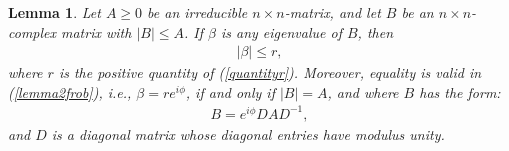 \documentclass[a4paper,11pt]{report}
\newtheorem{lemma}[theorem]{Lemma}
\begin{document}
  \begin{lemma}\label{lemma2frobvolledig}
    Let $A \geq 0$ be an irreducible $n\times n$-matrix, and let $B$ be an $n\times 
    n$- complex matrix with $|B|\leq A$. If $\beta$ is any eigenvalue of $B$, 
    then 
\begin{eqnarray}\label{lemma2frob}
|\beta| \leq r,  
\end{eqnarray}
where $r$ is the positive quantity of (\ref{quantityr}). Moreover, equality is 
valid in (\ref{lemma2frob}), i.e., $\beta = re^{i\phi}$, if and only if $|B| = 
A$, and where $B$ has the form:
\begin{eqnarray}\label{lemma2frobvormB}
B = e^{i\phi}DAD^{-1},
\end{eqnarray}
and $D$ is a diagonal matrix whose diagonal entries have modulus unity.
  \end{lemma}
  
\end{document}
